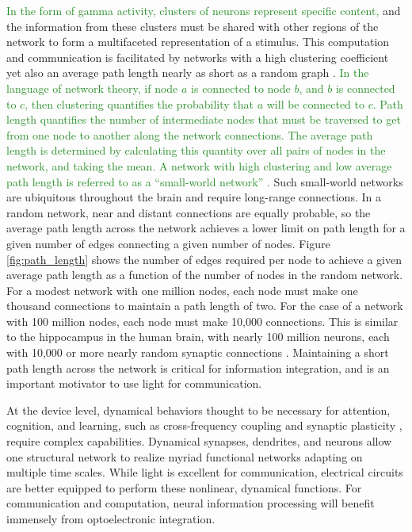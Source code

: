 \documentclass[twocolumn]{article}
\begin{document}
\textcolor{ForestGreen}{In the form of gamma activity, clusters of neurons represent specific content,} and the information from these clusters must be shared with other regions of the network to form a multifaceted representation of a stimulus. This computation and communication is facilitated by networks with a high clustering coefficient yet also an average path length nearly as short as a random graph \cite{eskn2015}. \textcolor{ForestGreen}{In the language of network theory, if node $a$ is connected to node $b$, and $b$ is connected to $c$, then clustering quantifies the probability that $a$ will be connected to $c$. Path length quantifies the number of intermediate nodes that must be traversed to get from one node to another along the network connections. The average path length is determined by calculating this quantity over all pairs of nodes in the network, and taking the mean. A network with high clustering and low average path length is referred to as a ``small-world network'' \cite{wast1998}.} Such small-world networks are ubiquitous throughout the brain \cite{sp2010} and require long-range connections. In a random network, near and distant connections are equally probable, so the average path length across the network achieves a lower limit on path length for a given number of edges connecting a given number of nodes. Figure \ref{fig:path_length} shows the number of edges required per node to achieve a given average path length as a function of the number of nodes in the random network. For a modest network with one million nodes, each node must make one thousand connections to maintain a path length of two. For the case of a network with 100 million nodes, each node must make 10,000 connections. This is similar to the hippocampus in the human brain, with nearly 100 million neurons, each with 10,000 or more nearly random synaptic connections \cite{bu2006}. Maintaining a short path length across the network is critical for information integration, and is an important motivator to use light for communication.

At the device level, dynamical behaviors thought to be necessary for attention, cognition, and learning, such as cross-frequency coupling \cite{bu2006} and synaptic plasticity \cite{mage2012,ab2008,fudr2005}, require complex capabilities. Dynamical synapses, dendrites, and neurons allow one structural network to realize myriad functional networks adapting on multiple time scales. While light is excellent for communication, electrical circuits are better equipped to perform these nonlinear, dynamical functions. For communication and computation, neural information processing will benefit immensely from optoelectronic integration.
\end{document}
